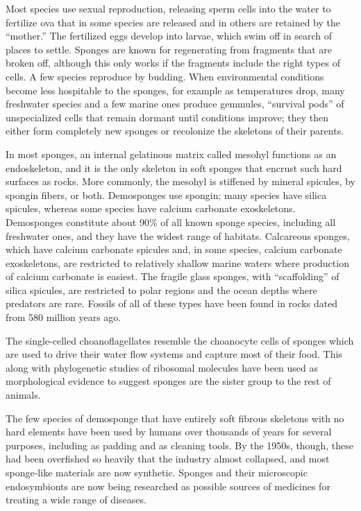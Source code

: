 Most species use sexual reproduction, releasing sperm cells into the water to fertilize ova that in some species are released and in others are retained by the ``mother.'' The fertilized eggs develop into larvae, which swim off in search of places to settle. Sponges are known for regenerating from fragments that are broken off, although this only works if the fragments include the right types of cells. A few species reproduce by budding. When environmental conditions become less hospitable to the sponges, for example as temperatures drop, many freshwater species and a few marine ones produce gemmules, ``survival pods'' of unspecialized cells that remain dormant until conditions improve; they then either form completely new sponges or recolonize the skeletons of their parents.

In most sponges, an internal gelatinous matrix called mesohyl functions as an endoskeleton, and it is the only skeleton in soft sponges that encrust such hard surfaces as rocks. More commonly, the mesohyl is stiffened by mineral spicules, by spongin fibers, or both. Demosponges use spongin; many species have silica spicules, whereas some species have calcium carbonate exoskeletons. Demosponges constitute about 90\% of all known sponge species, including all freshwater ones, and they have the widest range of habitats. Calcareous sponges, which have calcium carbonate spicules and, in some species, calcium carbonate exoskeletons, are restricted to relatively shallow marine waters where production of calcium carbonate is easiest. The fragile glass sponges, with ``scaffolding'' of silica spicules, are restricted to polar regions and the ocean depths where predators are rare. Fossils of all of these types have been found in rocks dated from 580 million years ago.

The single-celled choanoflagellates resemble the choanocyte cells of sponges which are used to drive their water flow systems and capture most of their food. This along with phylogenetic studies of ribosomal molecules have been used as morphological evidence to suggest sponges are the sister group to the rest of animals.

The few species of demosponge that have entirely soft fibrous skeletons with no hard elements have been used by humans over thousands of years for several purposes, including as padding and as cleaning tools. By the 1950s, though, these had been overfished so heavily that the industry almost collapsed, and most sponge-like materials are now synthetic. Sponges and their microscopic endosymbionts are now being researched as possible sources of medicines for treating a wide range of diseases.

